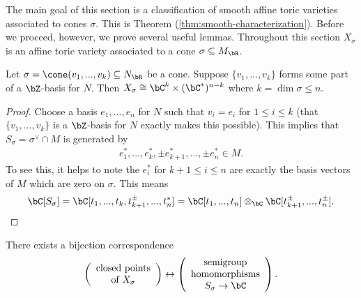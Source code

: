 The main goal of this section is a classification of smooth affine toric varieties associated to cones $\sigma$. This is Theorem (\ref{thm:smooth-characterization}). Before we proceed, however, we prove several useful lemmas. Throughout this section $X_\sigma$ is an affine toric variety associated to a cone $\sigma \subseteq M_\bR$.
\begin{lem}\label{lem:Z-basis-smooth-lemma}
	Let $\sigma = \cone(v_1,...,v_k)\subseteq N_\bR$ be a cone. Suppose $\{v_1,...,v_k\}$ forms some part of a $\bZ$-basis for $N$. Then $X_\sigma \cong \bC^k\times (\bC^*)^{n-k}$ where $k = \dim \sigma \leq n$.
\end{lem}
\begin{proof}
	Choose a basis $e_1,...,e_n$ for $N$ such that $v_i = e_i$ for $1 \leq i\leq k$ (that $\{v_1,...,v_k\}$ is a $\bZ$-basis for $N$ exactly makes this possible). This implies that $S_\sigma = \sigma^{\vee}\cap M$ is generated by 
	\begin{align*}
		e_1^*,...,e_k^*, \pm e_{k+1}^*,...,\pm e_n^* \in M.
	\end{align*}
	To see this, it helps to note the $e_{i}^*$ for $k+1 \leq i\leq n$ are exactly the basis vectors of $M$ which are zero on $\sigma$. This means
	\begin{align*}
		\bC[S_\sigma] = \bC[t_1,...,t_k,t_{k+1}^{\pm}, ..., t_n^{*}] = \bC[t_1,...,t_n] \otimes_\bC \bC[t_{k+1}^\pm, ...,t_n^\pm]. 
	\end{align*}
\end{proof}

\begin{lem}\label{lem:closed-points-and-semigroup-hom}
	There exists a bijection correspondence
	\begin{align*}
		\left(\begin{array}{c}
			\text{closed points} \\
			\text{of } X_\sigma
		\end{array}\right) \leftrightarrow
		\left(\begin{array}{c}
			\text{semigroup} \\
			\text{homomorphisms} \\
			S_\sigma \to \bC
		\end{array}\right).
	\end{align*}
\end{lem}

